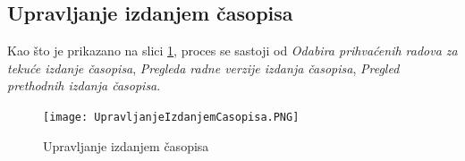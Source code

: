 \documentclass[a4paper]{article}
\begin{document}
\newpage

\subsection{Upravljanje izdanjem časopisa}
\label{subsection:upravljanjeizdanjemsec}

Kao što je prikazano na slici \ref{fig:upravljanjeizdanjem}, proces se sastoji od \textit{Odabira prihvaćenih radova za tekuće izdanje časopisa}, \textit{Pregleda radne verzije izdanja časopisa}, \textit{Pregled prethodnih izdanja časopisa}.
\begin{figure}[hbt!]
    \centering
    \texttt{[image: UpravljanjeIzdanjemCasopisa.PNG]}
    \caption{Upravljanje izdanjem časopisa \cite{alex} \cite{vparadigm}}
    \label{fig:upravljanjeizdanjem}
\end{figure}
\end{document}
